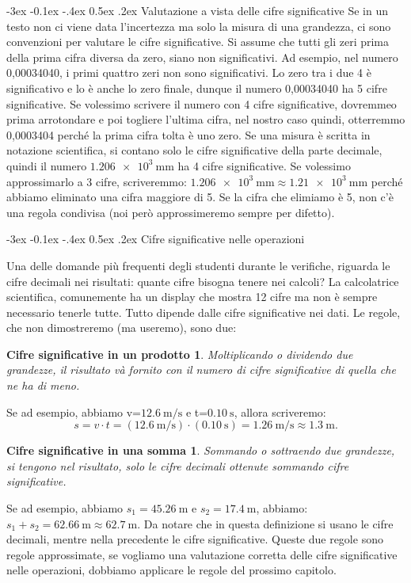 \documentclass[12pt,a4paper,oneside]{book}
\makeatletter
\newtheorem{csp}{Cifre significative in un prodotto}
\newtheorem{css}{Cifre significative in una somma}
\renewcommand{\subsection}{\@startsection {subsection}{2}{\z@}
{-3ex \@plus -0.1ex \@minus -.4ex}
{0.5ex \@plus.2ex }
{\color[rgb]{0.141,0.596,0.749}\normalfont\sffamily\bfseries}}
\theoremstyle{esercizio}
\makeatother
\begin{document}
\subsection{Valutazione a vista delle cifre significative}
Se in un testo non ci viene data l'incertezza ma solo la misura di una grandezza, ci sono convenzioni per valutare le cifre significative. Si assume che tutti gli zeri prima della prima cifra diversa da zero, siano non significativi. Ad esempio, nel numero 0,00034040, i primi quattro zeri non sono significativi. Lo zero tra i due 4 è significativo e lo è anche lo zero finale, dunque il numero 0,00034040 ha 5 cifre significative. Se volessimo scrivere il numero con 4 cifre significative, dovremmeo prima arrotondare e poi togliere l'ultima cifra, nel nostro caso quindi, otterremmo 0,0003404 perché la prima cifra tolta è uno zero. Se una misura è scritta in notazione scientifica, si contano solo le cifre significative della parte decimale, quindi il numero $\SI{1,206e+3}{\milli\meter}$ ha 4 cifre significative. Se volessimo approssimarlo a 3 cifre, scriveremmo: $\SI{1,206e+3}{\milli\meter} \approx \SI{1,21e+3}{\milli\meter}$ perché abbiamo eliminato una cifra maggiore di 5. Se la cifra che elimiamo è 5, non c'è una regola condivisa (noi però approssimeremo sempre per difetto).



\subsection{Cifre significative nelle operazioni}

Una delle domande più frequenti degli studenti durante le verifiche, riguarda le cifre decimali nei risultati: quante cifre bisogna tenere nei calcoli? La calcolatrice scientifica, comunemente ha un display che mostra 12 cifre ma non è sempre necessario tenerle tutte. Tutto dipende dalle cifre significative nei dati. Le regole, che non dimostreremo (ma useremo), sono due:
\begin{csp}
Moltiplicando o dividendo due grandezze, il risultato và fornito con il numero di cifre significative di quella che ne ha di meno.
\end{csp}
Se ad esempio, abbiamo v=$\SI{12,6}{\meter\per\second}$ e t=$\SI{0,10}{\second}$, allora scriveremo:
\[
s=v\cdot t =  \left(\SI{12,6}{\meter\per\second} \right)\cdot\left( \SI{0,10}{\second}\right) = \SI{1,26}{\meter\per\second} \approx \SI{1,3}{\meter}. 
\]
\begin{css}
Sommando o sottraendo due grandezze, si tengono nel risultato, solo le cifre decimali ottenute sommando cifre significative.
\end{css}
Se ad esempio, abbiamo $s_1=\SI{45,26}{\meter}$ e $s_2=\SI{17,4}{\meter}$, abbiamo: $s_1 +s_2 = \SI{62,66}{\meter} \approx \SI{62,7}{\meter}$. Da notare che in questa definizione si usano le cifre decimali, mentre nella precedente le cifre significative. Queste due regole sono regole approssimate, se vogliamo una valutazione corretta delle cifre significative nelle operazioni, dobbiamo applicare le regole del prossimo capitolo.
\end{document}
